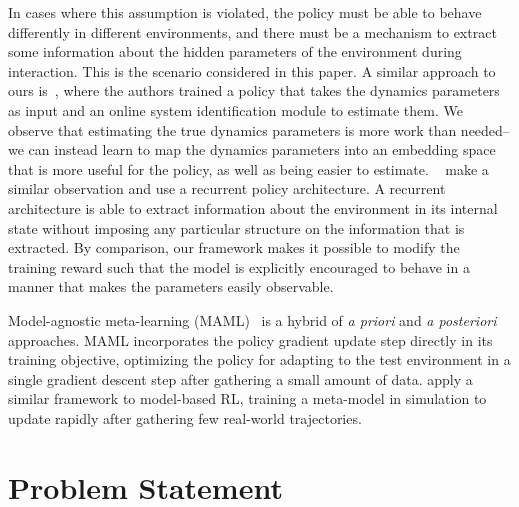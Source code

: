 \documentclass{article}
\begin{document}
In cases where this assumption is violated, the policy must be able to behave differently in different environments,
and there must be a mechanism to extract some information about the hidden parameters of the environment during interaction.
This is the scenario considered in this paper.
A similar approach to ours is~\citet{yu-up-osi-rss17},
where the authors trained a policy that takes the dynamics parameters as input
and an online system identification module to estimate them.
We observe that estimating the true dynamics parameters is more work than needed--
we can instead learn to map the dynamics parameters into an embedding space
that is more useful for the policy, as well as being easier to estimate.
~\citet{peng-dynamics-randomization-corr17} make a similar observation and use a recurrent policy architecture.
A recurrent architecture is able to extract information about the environment in its internal state without imposing any particular structure on the information that is extracted.
By comparison, our framework makes it possible to modify the training reward such that the model is explicitly encouraged to behave in a manner that makes the parameters easily observable.

Model-agnostic meta-learning (MAML)~\citep{finn-maml-icml17} is a hybrid of \emph{a priori} and \emph{a posteriori} approaches.
MAML incorporates the policy gradient update step directly in its training objective,
optimizing the policy for adapting to the test environment in a single gradient descent step after gathering a small amount of data.
\citet{clavera-maml-model} apply a similar framework to model-based RL, training a meta-model in simulation
to update rapidly after gathering few real-world trajectories.




\section{Problem Statement}
\end{document}
